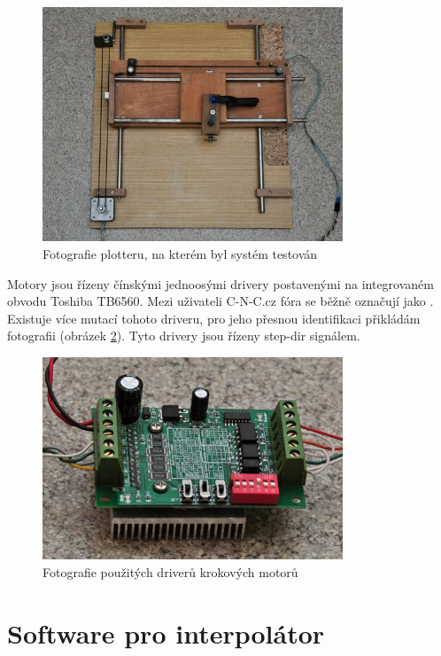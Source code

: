 	\begin{figure}[h]
		\centering
		\includegraphics[width=0.8\textwidth]{img/plotter2.jpg}
		\caption{Fotografie plotteru, na kterém byl systém testován}\label{fot:plotter2}	
	\end{figure}
	
	Motory jsou řízeny čínskými  jednoosými drivery postavenými na integrovaném obvodu Toshiba TB6560\cite{TB6560}. Mezi uživateli C-N-C.cz fóra se běžně označují jako . Existuje více mutací tohoto driveru, pro jeho přesnou identifikaci přikládám fotografii (obrázek \ref{fot:tb6560}). Tyto drivery jsou řízeny step-dir signálem.
	
	\begin{figure}[h]
		\centering
		\includegraphics[width=0.8\textwidth]{img/tb6560.jpg}
		\caption{Fotografie použitých driverů krokových motorů}\label{fot:tb6560}	
	\end{figure}
	
\chapter{Software pro interpolátor}

